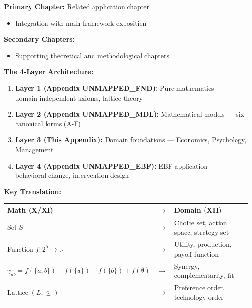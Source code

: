 \begin{tcolorbox}[colback=purple!5!white, colframe=purple!75!black,
    title=Chapter Linkage]

\textbf{Primary Chapter:} Related application chapter
\begin{itemize}[nosep]
\item Integration with main framework exposition
\end{itemize}

\textbf{Secondary Chapters:}
\begin{itemize}[nosep]
\item Supporting theoretical and methodological chapters
\end{itemize}

\end{tcolorbox}

\begin{tcolorbox}[colback=blue!5!white,colframe=blue!75!black,title=\textbf{Quick Reference: Layer 3 Position}]
\textbf{The 4-Layer Architecture:}
\begin{enumerate}[noitemsep]
    \item \textbf{Layer 1 (Appendix UNMAPPED_FND):} Pure mathematics — domain-independent axioms, lattice theory
    \item \textbf{Layer 2 (Appendix UNMAPPED_MDL):} Mathematical models — six canonical forms (A-F)
    \item \textbf{Layer 3 (This Appendix):} Domain foundations — Economics, Psychology, Management
    \item \textbf{Layer 4 (Appendix UNMAPPED_EBF):} EBF application — behavioral change, intervention design
\end{enumerate}

\textbf{Key Translation:}
\begin{center}
\begin{tabular}{lll}
\textbf{Math (X/XI)} & $\rightarrow$ & \textbf{Domain (XII)} \\
\hline
Set $S$ & $\rightarrow$ & Choice set, action space, strategy set \\
Function $f: 2^S \to \mathbb{R}$ & $\rightarrow$ & Utility, production, payoff function \\
$\gamma_{ab} = f(\{a,b\}) - f(\{a\}) - f(\{b\}) + f(\emptyset)$ & $\rightarrow$ & Synergy, complementarity, fit \\
Lattice $(L, \leq)$ & $\rightarrow$ & Preference order, technology order \\
\end{tabular}
\end{center}
\end{tcolorbox}

